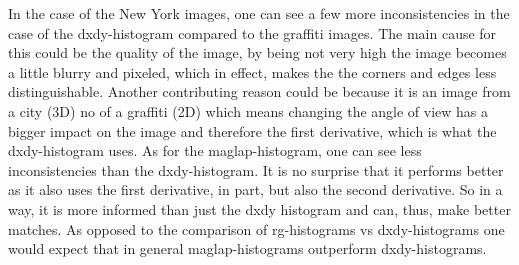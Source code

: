 \documentclass[12pt]{article}
\begin{document}
\begin{enumerate}[a)]
	In the case of the New York images, one can see a few more inconsistencies in the case of the dxdy-histogram compared to the graffiti images. The main cause for this could be the quality of the image, by being not very high the image becomes a little blurry and pixeled, which in effect, makes the the corners and edges less distinguishable. Another contributing reason could be because it is an image from a city (3D) no of a graffiti (2D) which means changing the angle of view has a bigger impact on the image and therefore the first derivative, which is what the dxdy-histogram uses. As for the maglap-histogram, one can see less inconsistencies than the dxdy-histogram. It is no surprise that it performs better as it also uses the first derivative, in part, but also the second derivative. So in a way, it is more informed than just the dxdy histogram and can, thus, make better matches. As opposed to the comparison of rg-histograms vs dxdy-histograms one would expect that in general maglap-histograms outperform dxdy-histograms.
	
	

\end{enumerate}

\newpage
\end{document}
